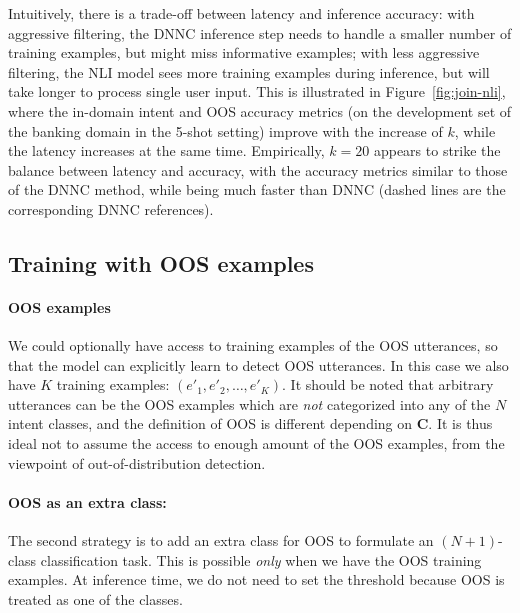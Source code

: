 Intuitively, there is a trade-off between latency and inference accuracy: with aggressive filtering, the DNNC inference step needs to handle a smaller number of training examples, but might miss informative examples; with less aggressive filtering, the NLI model sees more training examples during inference, but will take longer to process single user input.
This is illustrated in Figure~\ref{fig:join-nli}, where the in-domain intent and OOS accuracy metrics (on the development set of the banking domain in the 5-shot setting) improve with the increase of $k$, while the latency increases at the same time.
Empirically, $k=20$ appears to strike the balance between latency and accuracy, with the accuracy metrics similar to those of the DNNC method, while being much faster than DNNC (dashed lines are the corresponding DNNC references).




\subsection{Training with OOS examples}

\paragraph{OOS examples}
We could optionally have access to training examples of the OOS utterances, so that the model can explicitly learn to detect OOS utterances.
In this case we also have $K$ training examples: $(e'_1, e'_2, \ldots, e'_K)$.
It should be noted that arbitrary utterances can be the OOS examples which are {\it not} categorized into any of the $N$ intent classes, and the definition of OOS is different depending on $\mathbf{C}$.
It is thus ideal not to assume the access to enough amount of the OOS examples, from the viewpoint of out-of-distribution detection.

\paragraph{OOS as an extra class:}
The second strategy is to add an extra class for OOS to formulate an $(N+1)$-class classification task.
This is possible {\it only} when we have the OOS training examples.
At inference time, we do not need to set the threshold because OOS is treated as one of the classes.

